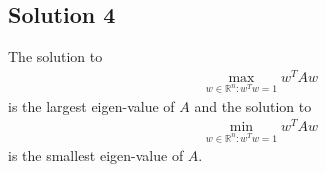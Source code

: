 \subsection*{Solution 4}
The solution to 
\begin{align*}
	\max\limits_{w \in \mathbb{R}^n:w^Tw = 1}w^TAw
\end{align*}
is the largest eigen-value of $A$ and the solution to 
\begin{align*}
	\min\limits_{w \in \mathbb{R}^n:w^Tw = 1}w^TAw
\end{align*}
is the smallest eigen-value of $A$.